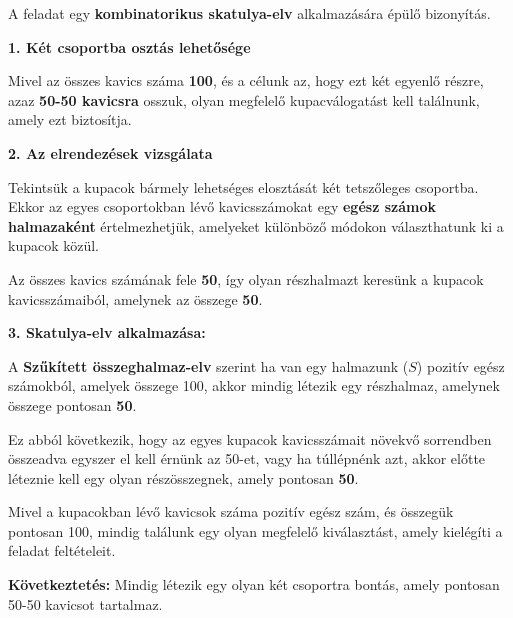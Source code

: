 \begin{solution}
	A feladat egy \textbf{kombinatorikus skatulya-elv} alkalmazására épülő
	bizonyítás.
	
	\textbf{1. Két csoportba osztás lehetősége}
	
	Mivel az összes kavics száma \textbf{100}, és a célunk az, hogy ezt
	két egyenlő részre, azaz \textbf{50-50 kavicsra} osszuk, olyan megfelelő
	kupacválogatást kell találnunk, amely ezt biztosítja.
	
	\textbf{2. Az elrendezések vizsgálata}
	
	Tekintsük a kupacok bármely lehetséges elosztását két tetszőleges
	csoportba. Ekkor az egyes csoportokban lévő kavicsszámokat egy \textbf{egész
		számok halmazaként} értelmezhetjük, amelyeket különböző módokon választhatunk
	ki a kupacok közül.
	
	Az összes kavics számának fele \textbf{50}, így olyan részhalmazt
	keresünk a kupacok kavicsszámaiból, amelynek az összege \textbf{50}.
	
	\textbf{3. Skatulya-elv alkalmazása:}
	
	A \textbf{Szűkített összeghalmaz-elv} szerint ha van egy halmazunk
	($S$) pozitív egész számokból, amelyek összege 100, akkor mindig
	létezik egy részhalmaz, amelynek összege pontosan \textbf{50}.
	
	Ez abból következik, hogy az egyes kupacok kavicsszámait növekvő sorrendben
	összeadva egyszer el kell érnünk az 50-et, vagy ha túllépnénk azt,
	akkor előtte léteznie kell egy olyan részösszegnek, amely pontosan
	\textbf{50}.
	
	Mivel a kupacokban lévő kavicsok száma pozitív egész szám, és összegük
	pontosan 100, mindig találunk egy olyan megfelelő kiválasztást, amely
	kielégíti a feladat feltételeit.
	
	\textbf{Következtetés:} Mindig létezik egy olyan két csoportra bontás,
	amely pontosan 50-50 kavicsot tartalmaz.
\end{solution}